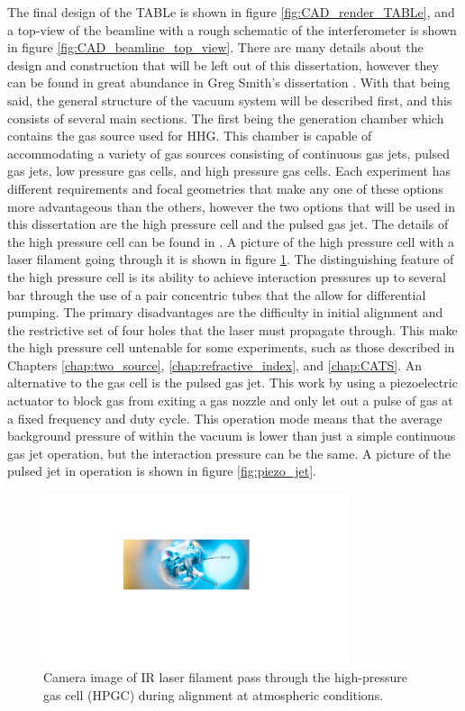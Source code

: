 The final design of the TABLe is shown in figure \ref{fig:CAD_render_TABLe}, and a top-view of the beamline with a rough schematic of the interferometer is shown in figure \ref{fig:CAD_beamline_top_view}. There are many details about the design and construction that will be left out of this dissertation, however they can be found in great abundance in Greg Smith's dissertation \cite{smithApplicationAttosecondTechniques2020}.  With that being said, the general structure of the vacuum system will be described first, and this consists of several main sections.  The first being the generation chamber which contains the gas source used for HHG.  This chamber is capable of accommodating a variety of gas sources consisting of continuous gas jets, pulsed gas jets, low pressure gas cells, and high pressure gas cells.  Each experiment has different requirements and focal geometries that make any one of these options more advantageous than the others, however the two options that will be used in this dissertation are the high pressure cell and the pulsed gas jet.  The details of the high pressure cell can be found in \cite{smithApplicationAttosecondTechniques2020}.  A picture of the high pressure cell with a laser filament going through it is shown in figure \ref{fig:HPGC_filament}.  The distinguishing feature of the high pressure cell is its ability to achieve interaction pressures up to several bar through the use of a pair concentric tubes that the allow for differential pumping.  The primary disadvantages are the difficulty in initial alignment and the restrictive set of four holes that the laser must propagate through.  This make the high pressure cell untenable for some experiments, such as those described in Chapters \ref{chap:two_source}, \ref{chap:refractive_index}, and \ref{chap:CATS}.  An alternative to the gas cell is the pulsed gas jet.  This work by using a piezoelectric actuator to block gas from exiting a gas nozzle and only let out a pulse of gas at a fixed frequency and duty cycle.  This operation mode means that the average background pressure of within the vacuum is lower than just a simple continuous gas jet operation, but the interaction pressure can be the same.  A picture of the pulsed jet in operation is shown in figure \ref{fig:piezo_jet}.
\label{sec:gas_source}
\begin{figure}
	\centering
	\includegraphics[width=0.8\textwidth]{figures/Beamline/HPGC.pdf}
	\caption[Image of laser passing through HPGC]{Camera image of IR laser filament pass through the high-pressure gas cell (HPGC) during alignment at atmospheric conditions.}
	\label{fig:HPGC_filament}
\end{figure}


